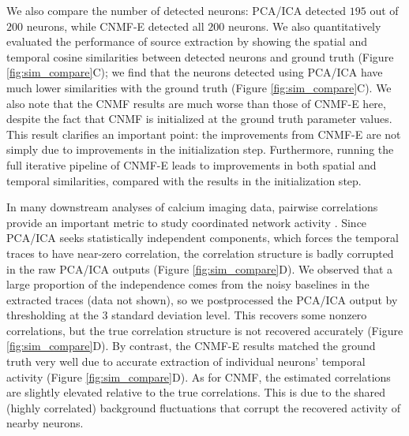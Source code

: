 \documentclass[9pt,lineno]{elife}
\begin{document}
We also compare the number of detected neurons: PCA/ICA detected $195$ out of $200$ neurons, while CNMF-E detected all $200$ neurons. We also quantitatively evaluated the performance of source extraction by showing the spatial and temporal cosine similarities between detected neurons and ground truth (Figure \ref{fig:sim_compare}C); we find that the neurons detected using PCA/ICA have much lower similarities with the ground truth (Figure \ref{fig:sim_compare}C). We also note that the CNMF results are much worse than those of CNMF-E here, despite the fact that CNMF is initialized at the ground truth parameter values.  This result clarifies an important point: the improvements from CNMF-E are not simply due to improvements in the initialization step.  Furthermore, running the full iterative pipeline of CNMF-E leads to improvements in both spatial and temporal similarities, compared with the results in the initialization step.

In many downstream analyses of calcium imaging data, pairwise correlations provide an important metric to study coordinated network activity \citep{Warp2012,Barbera2016,Dombeck2009,Klaus2017}. Since PCA/ICA seeks statistically independent components, which forces the temporal traces to have near-zero correlation, the correlation structure is badly corrupted in the raw PCA/ICA outputs (Figure \ref{fig:sim_compare}D). We observed that a large proportion of the independence comes from the noisy baselines in the extracted traces (data not shown), so we postprocessed the PCA/ICA output by thresholding at the $3$ standard deviation level. This recovers some nonzero correlations, but the true correlation structure is not recovered accurately (Figure \ref{fig:sim_compare}D). By contrast, the CNMF-E results matched the ground truth very well due to accurate extraction of individual neurons' temporal activity (Figure \ref{fig:sim_compare}D). As for CNMF, the estimated correlations are slightly elevated relative to the true correlations. This is due to the shared (highly correlated) background fluctuations that corrupt the recovered activity of nearby neurons. 
\end{document}
